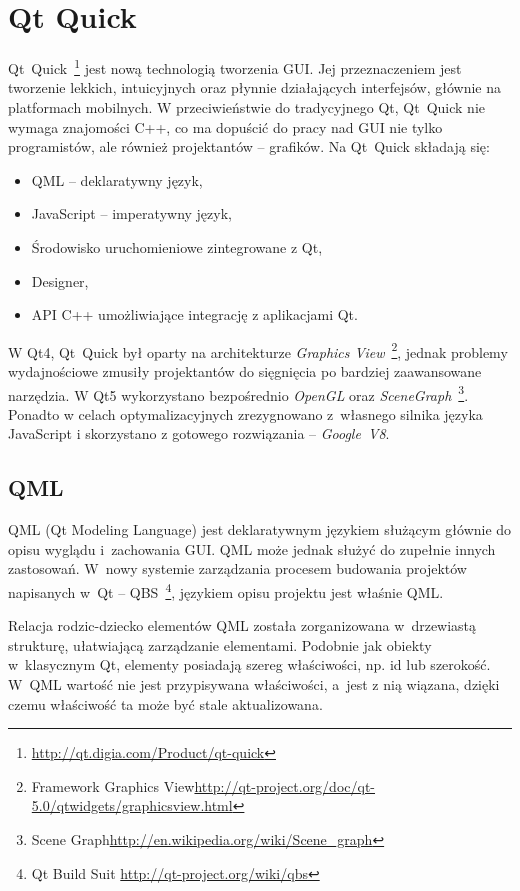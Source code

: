\section{Qt Quick}
Qt~Quick~\footnote{\url{http://qt.digia.com/Product/qt-quick}} jest nową technologią tworzenia GUI. Jej przeznaczeniem jest tworzenie lekkich, intuicyjnych oraz płynnie działających interfejsów, głównie na platformach mobilnych. W przeciwieństwie do tradycyjnego Qt, Qt~Quick nie wymaga znajomości C++, co ma dopuścić do pracy nad GUI nie tylko programistów, ale również projektantów -- grafików.
Na Qt~Quick składają się:
\begin{itemize}
\item QML -- deklaratywny język,
\item JavaScript -- imperatywny język,
\item Środowisko uruchomieniowe zintegrowane z Qt,
\item Designer,
\item API C++ umożliwiające integrację z aplikacjami Qt.
\end{itemize}

W Qt4, Qt~Quick był oparty na architekturze \textit{Graphics View}~\footnote{Framework Graphics View\url{http://qt-project.org/doc/qt-5.0/qtwidgets/graphicsview.html}}, jednak problemy wydajnościowe zmusiły projektantów do sięgnięcia po bardziej zaawansowane narzędzia. W Qt5 wykorzystano bezpośrednio \textit{OpenGL} oraz \textit{SceneGraph}~\footnote{Scene Graph\url{http://en.wikipedia.org/wiki/Scene\_graph}}. Ponadto w celach optymalizacyjnych zrezygnowano z~własnego silnika języka JavaScript i skorzystano z gotowego rozwiązania -- \textit{Google~V8}.

\subsection{QML}
QML (Qt Modeling Language) jest deklaratywnym językiem służącym głównie do opisu wyglądu i~zachowania GUI. QML może jednak służyć do zupełnie innych zastosowań. W~nowy systemie zarządzania procesem budowania projektów napisanych w~Qt -- QBS~\footnote{Qt Build Suit \url{http://qt-project.org/wiki/qbs}}, językiem opisu projektu jest właśnie QML.\newline

Relacja rodzic-dziecko elementów QML została zorganizowana w~drzewiastą strukturę, ułatwiającą zarządzanie elementami. Podobnie jak obiekty w~klasycznym Qt, elementy posiadają szereg właściwości, np. id lub szerokość. W~QML wartość nie jest przypisywana właściwości, a~jest z nią wiązana, dzięki czemu właściwość ta może być stale aktualizowana.\newline

